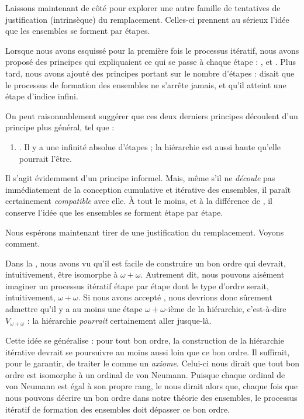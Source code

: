 \documentclass[../../../include/open-logic-section]{subfiles}
\begin{document}

Laissons maintenant \limofsize{} de côté pour explorer une autre
famille de tentatives de justification (intrinsèque) du remplacement.
Celles-ci prennent au sérieux l'idée que les ensembles se forment
par étapes.

Lorsque nous avons esquissé pour la première fois le processus
itératif, nous avons proposé des principes qui expliquaient ce
qui se passe à chaque étape : \stageshier, \stagesord{} et
\stagesacc. Plus tard, nous avons ajouté des principes portant
sur le nombre d'étapes : \stagessucc{} disait que le processus
de formation des ensembles ne s'arrête jamais, et \stagesinf{}
qu'il atteint une étape d'indice infini.

On peut raisonnablement suggérer que ces deux derniers principes
découlent d'un principe plus général, tel que :
\begin{enumerate}
	\item[] \stagesinex. Il y a une infinité absolue d'étapes ;
	la hiérarchie est aussi haute qu'elle pourrait l'être.
\end{enumerate}
Il s'agit évidemment d'un principe informel. Mais, même s'il ne
\emph{découle} pas immédiatement de la conception cumulative et
itérative des ensembles, il paraît certainement \emph{compatible}
avec elle. À tout le moins, et à la différence de \limofsize,
il conserve l'idée que les ensembles se forment étape par étape.

Nous espérons maintenant tirer de \stagesinex{} une justification
du remplacement. Voyons comment.

Dans la , nous avons vu qu'il est facile
de construire un bon ordre qui devrait, intuitivement, être
isomorphe à $\omega+\omega$. Autrement dit, nous pouvons aisément
imaginer un processus itératif étape par étape dont le type
d'ordre serait, intuitivement, $\omega+\omega$. Si nous avons
accepté \stagesinex, nous devrions donc sûrement admettre
qu'il y a au moins une étape $\omega+\omega$-ième de la
hiérarchie, c'est-à-dire $V_{\omega+\omega}$ : la hiérarchie
\emph{pourrait} certainement aller jusque-là.

Cette idée se généralise : pour tout bon ordre, la construction
de la hiérarchie itérative devrait se poursuivre au moins aussi
loin que ce bon ordre. Il suffirait, pour le garantir, de traiter
le  comme un
\emph{axiome}. Celui-ci nous dirait que tout bon ordre est
isomorphe à un ordinal de von Neumann. Puisque chaque ordinal
de von Neumann est égal à son propre rang,
le  nous
dirait alors que, chaque fois que nous pouvons décrire un bon
ordre dans notre théorie des ensembles, le processus itératif
de formation des ensembles doit dépasser ce bon ordre.
\end{document}

